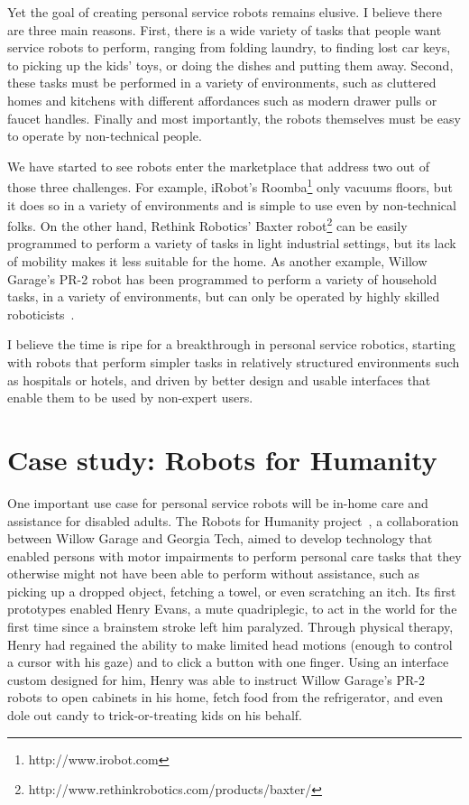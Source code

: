 \documentclass[10pt,twocolumn]{article}
\begin{document}
Yet the goal of creating personal service robots remains elusive. I believe there are three main reasons. First, there is a wide variety of tasks that people want service robots to perform, ranging from folding laundry, to finding lost car keys, to picking up the kids' toys, or doing the dishes and putting them away. Second, these tasks must be performed in a variety of environments, such as cluttered homes and kitchens with different affordances such as modern drawer pulls or faucet handles. Finally and most importantly, the robots themselves must be easy to operate by non-technical people.

We have started to see robots enter the marketplace that address two out of those three challenges. For example, iRobot's Roomba\footnote{http://www.irobot.com} only vacuums floors, but it does so in a variety of environments and is simple to use even by non-technical folks. On the other hand, Rethink Robotics' Baxter robot\footnote{http://www.rethinkrobotics.com/products/baxter/} can be easily programmed to perform a variety of tasks in light industrial settings, but its lack of mobility makes it less suitable for the home. As another example, Willow Garage's PR-2 robot has been programmed to perform a variety of household tasks, in a variety of environments, but can only be operated by highly skilled roboticists~\cite{ciocarlie-iser10}.

I believe the time is ripe for a breakthrough in personal service robotics, starting with robots that perform simpler tasks in relatively structured environments such as hospitals or hotels, and driven by better design and usable interfaces that enable them to be used by non-expert users.

\section{Case study: Robots for Humanity}

One important use case for personal service robots will be in-home care and assistance for disabled adults. The Robots for Humanity project~\cite{rfh}, a collaboration between Willow Garage and Georgia Tech, aimed to develop technology that enabled persons with motor impairments to perform personal care tasks that they otherwise might not have been able to perform without assistance, such as picking up a dropped object, fetching a towel, or even scratching an itch. Its first prototypes enabled Henry Evans, a mute quadriplegic, to act in the world for the first time since a brainstem stroke left him paralyzed. Through physical therapy, Henry had regained the ability to make limited head motions (enough to control a cursor with his gaze) and to click a button with one finger.  Using an interface custom designed for him, Henry was able to instruct Willow Garage's PR-2 robots to open cabinets in his home, fetch food from the refrigerator, and even dole out candy to trick-or-treating kids on his behalf.
\end{document}

